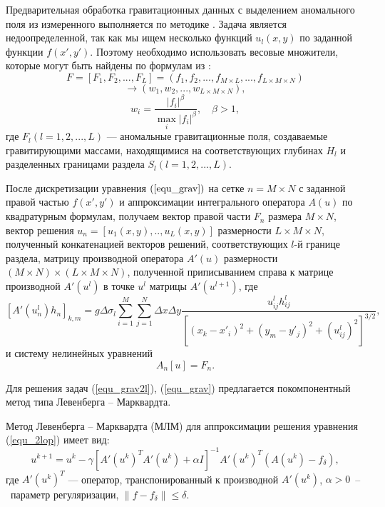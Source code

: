 Предварительная обработка гравитационных данных с выделением аномального поля из измеренного выполняется по методике  \cite{MarPrut2003}. Задача является недоопределенной, так как мы ищем несколько функций $u_l(x,y)$ по заданной функции $f(x',y')$. Поэтому необходимо использовать весовые множители, которые могут быть найдены по формулам из \cite{AkMarMis2013}:
$$F=[F_1, F_2, ..., F_L]=(f_1, f_2, ..., f_{M\times L}, ..., f_{L\times M\times N})$$
$$\to (w_1, w_2, ..., w_{L\times M\times N}),$$
\begin{equation}\label{weght_fact_formula}
w_i=\frac{|f_i|^\beta}{\max\limits_{i} |f_i|^\beta}, \quad \beta>1,
\end{equation}
где $F_l (l=1, 2, ..., L)$ --- аномальные гравитационные поля, создаваемые гравитирующими массами, находящимися на соответствующих глубинах $H_l$ и разделенных границами раздела $S_l(l=1, 2, ..., L)$.

После дискретизации уравнения $(\ref{equ_grav})$ на сетке $n=M\times N$ с заданной правой частью $f(x',y')$ и аппроксимации интегрального оператора $A(u)$ по квадратурным формулам, получаем вектор правой части $F_n$ размера  $M\times N$, вектор решения $u_n=[u_1(x,y),..,u_L(x,y)]$ размерности $L\times M\times N$, полученный конкатенацией векторов решений, соответствующих $l$-й границе раздела, матрицу производной оператора $A'(u)$ размерности $(M\times N)\times(L\times M\times N)$, полученной приписыванием справа к матрице производной $A'(u^l)$ в точке $u^l$ матрицы $A'(u^{l+1})$, где
\begin{equation}\label{op_grav_disc_form_mult}
[A'(u_n^l)h_n]_{k,m}=g\Delta\sigma_l\sum\limits_{i=1}^{M}\sum\limits_{j=1}^{N}
\Delta x\Delta y\frac{u^l_{ij}h^l_{ij}}{[(x_k-x'_i)^2+(y_m-y'_j)^2+(u^l_{ij})^2]^{3/2}},
\end{equation} и систему нелинейных уравнений  
\begin{equation}\label{snl_equ}
A_n[u]=F_n.
\end{equation}

Для решения задач (\ref{equ_grav2l}), (\ref{equ_grav}) предлагается покомпонентный метод типа Левенберга -- Марквардта. 

Метод Левенберга -- Марквардта (МЛМ) для аппроксимации решения уравнения (\ref{equ_2lop}) имеет вид:
\begin{equation}
u^{k+1}=u^k-\gamma[A'(u^k)^T A'(u^k)+\alpha I]^{-1} A'(u^k)^T(A(u^k)-f_\delta),
\end{equation}
где $A'(u^k)^T$ --- оператор, транспонированный к производной $A'(u^k)$, $\alpha>0$~--~параметр регуляризации, $\|f-f_\delta\|\le \delta.$
 
